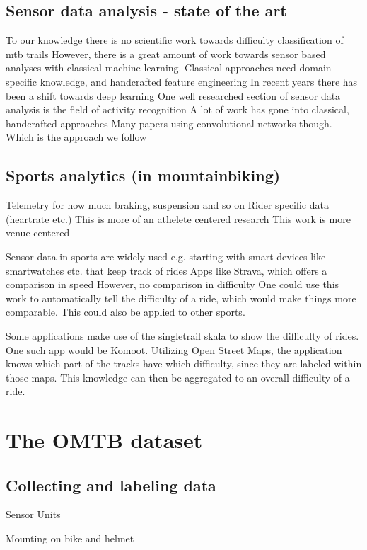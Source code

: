 \documentclass[runningheads]{llncs}
\begin{document}
\subsection{Sensor data analysis - state of the art}
To our knowledge there is no scientific work towards difficulty classification of mtb trails
However, there is a great amount of work towards sensor based analyses with classical machine learning.
Classical approaches need domain specific knowledge, and handcrafted feature engineering
In recent years there has been a shift towards deep learning
One well researched section of sensor data analysis is the field of activity recognition
A lot of work has gone into classical, handcrafted approaches
Many papers using convolutional networks though. 
Which is the approach we follow

\subsection{Sports analytics (in mountainbiking)}
Telemetry for how much braking, suspension and so on
Rider specific data (heartrate etc.)
This is more of an athelete centered research
This work is more venue centered

Sensor data in sports are widely used
e.g. starting with smart devices like smartwatches etc. that keep track of rides
Apps like Strava, which offers a comparison in speed
However, no comparison in difficulty
One could use this work to automatically tell the difficulty of a ride, which would make things more comparable. 
This could also be applied to other sports.

Some applications make use of the singletrail skala to show the difficulty of rides. 
One such app would be Komoot. 
Utilizing Open Street Maps, the application knows which part of the tracks have which difficulty, since they are labeled within those maps.
This knowledge can then be aggregated to an overall difficulty of a ride.




\section{The OMTB dataset}

\subsection{Collecting and labeling data}
Sensor Units

Mounting on bike and helmet
\end{document}
